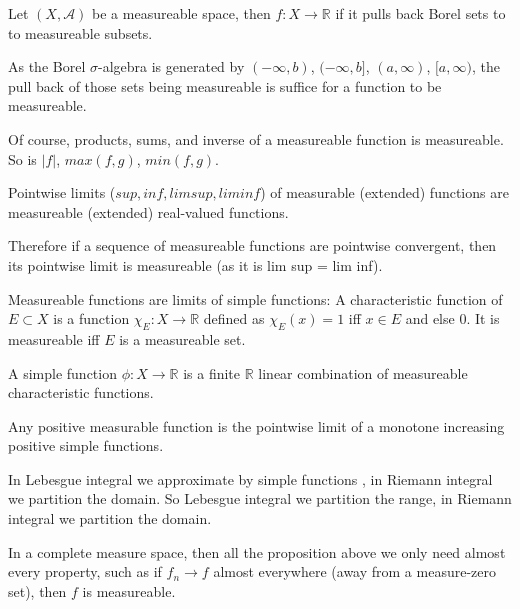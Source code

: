 \documentclass[main.tex]{subfiles}
\begin{document}
\begin{definition}
Let $(X, \mathcal{A})$ be a measureable space, then $f : X \rightarrow \mathbb{R}$ if it pulls back Borel sets to to measureable subsets.
\end{definition}

As the Borel $\sigma$-algebra is generated by $(-\infty, b)$, $(-\infty, b]$, $(a, \infty)$, $[a, \infty)$, the pull back of those sets being measureable is suffice for a function to be measureable.

Of course, products, sums, and inverse of a measureable function is measureable. So is $|f|$, $max(f,g)$, $min(f, g)$.




\begin{lemma}

Pointwise limits ($sup, inf, lim sup, lim inf$) of measurable (extended) functions are measureable (extended) real-valued functions. 
\end{lemma}

Therefore if a sequence of measureable functions are pointwise convergent, then its pointwise limit is measureable (as it is lim sup = lim inf).

Measureable functions are limits of simple functions:
A characteristic function of $E \subset X$ is a function $\chi_E: X \rightarrow \mathbb{R}$ defined as $\chi_E(x) = 1$ iff $x \in E$ and else $0$. It is measureable iff $E$ is a measureable set.

\begin{definition}
A simple function $\phi: X \rightarrow \mathbb{R}$ is a finite $\mathbb{R}$ linear combination of measureable characteristic functions.
\end{definition}


\begin{theorem}
Any positive measurable function is the pointwise limit of a monotone increasing positive simple functions. 
\end{theorem}

\begin{remark}
In Lebesgue integral we approximate by simple functions , in Riemann integral we partition the domain. So Lebesgue integral we partition the range, in Riemann integral we partition the domain.
\end{remark}

In a complete measure space, then all the proposition above we only need almost every property, such as if $f_n \rightarrow f$ almost everywhere (away from a measure-zero set), then $f$ is measureable.
\end{document}
